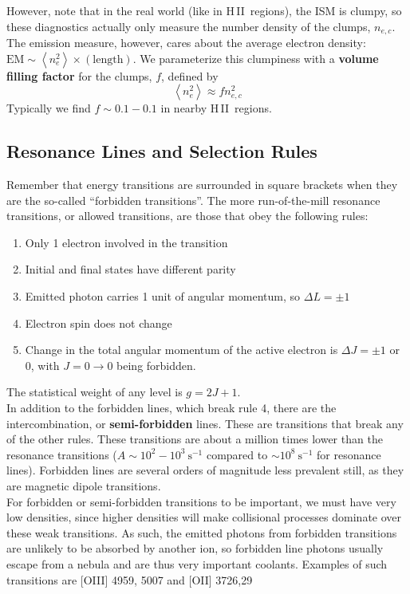 \documentclass[10pt]{article}
\numberwithin{equation}{section}
\newcommand{\n}{\noindent}
\newcommand{\avg}[1]{\left\langle#1\right\rangle}
\newcommand{\HII}{H\,II\ }
\begin{document}
\n However, note that in the real world (like in \HII regions), the ISM is
clumpy, so these diagnostics actually only measure the number density of the
clumps, $n_{e,c}$. The emission measure, however, cares about the average
electron density: $\mathrm{EM}\sim \avg{n_e^2}\times(\mathrm{length})$. We
parameterize this clumpiness with a \textbf{volume filling factor} for the
clumps, $f$, defined by
\begin{equation}
  \label{eq:ff:1} \avg{n_e^2}\approx fn_{e,c}^2
\end{equation}
Typically we find $f\sim 0.1-0.1$ in nearby \HII regions.
\subsection{Resonance Lines and Selection Rules} %
\label{sub:resonance_lines_and_selection_rules}
Remember that energy transitions are surrounded in square brackets when they
are the so-called ``forbidden transitions''. The more run-of-the-mill resonance
transitions, or allowed transitions, are those that obey the following rules:
\begin{enumerate}
  \item Only 1 electron involved in the transition
  \item Initial and final states have different parity
  \item Emitted photon carries 1 unit of angular momentum, so $\Delta L = \pm 1$
  \item Electron spin does not change
  \item Change in the total angular momentum of the active electron is $\Delta
  J = \pm 1$ or $0$, with $J=0\to0$ being forbidden.
\end{enumerate}
The statistical weight of any level is $g=2J + 1$.\\

\n In addition to the forbidden lines, which break rule 4, there are the
intercombination, or \textbf{semi-forbidden} lines. These are transitions that
break any of the other rules. These transitions are about a million times lower
than the resonance transitions ($A\sim 10^2-10^3\ \mathrm{s^{-1}}$ compared to
$\sim10^8\ \mathrm{s^{-1}}$ for resonance lines). Forbidden lines are several
orders of magnitude less prevalent still, as they are magnetic dipole
transitions.\\

\n For forbidden or semi-forbidden transitions to be important, we must have
very low densities, since higher densities will make collisional processes
dominate over these weak transitions. As such, the emitted photons from
forbidden transitions are unlikely to be absorbed by another ion, so forbidden
line photons usually escape from a nebula and are thus very important coolants.
Examples of such transitions are [OIII] 4959, 5007 and [OII] 3726,29
\end{document}
